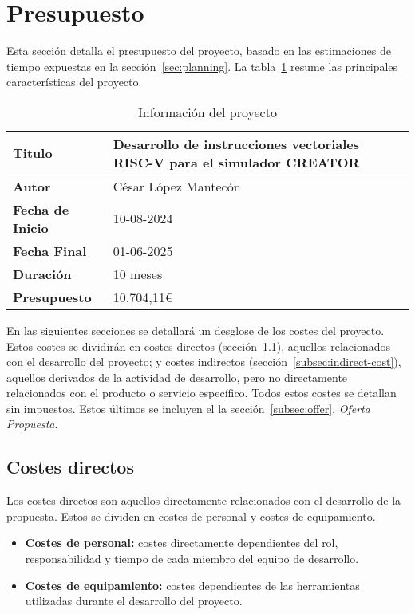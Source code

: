 \section{Presupuesto}\label{sec:budget}
Esta sección detalla el presupuesto del proyecto, basado en las estimaciones de tiempo expuestas en la sección~\ref{sec:planning}. La tabla~\ref{table:project-summary} resume las principales características del proyecto.

\begin{table}[H]
    \begin{tabular}{@{}ll@{}}
    \toprule
    \textbf{Titulo}          & Desarrollo de instrucciones vectoriales RISC-V para el simulador CREATOR \\ \midrule
    \textbf{Autor}           & César López Mantecón  \\ \midrule
    \textbf{Fecha de Inicio} & 10-08-2024            \\ \midrule
    \textbf{Fecha Final}     & 01-06-2025            \\ \midrule
    \textbf{Duración}        & 10 meses              \\ \midrule
    \textbf{Presupuesto}     & 10.704,11\euro        \\ \bottomrule
    \end{tabular}
    \caption{Información del proyecto}\label{table:project-summary} 
\end{table}

En las siguientes secciones se detallará un desglose de los costes del proyecto. Estos costes se dividirán en costes directos (sección~\ref{subsec:direct-cost}), aquellos relacionados con el desarrollo del proyecto; y costes indirectos (sección~\ref{subsec:indirect-cost}), aquellos derivados de la actividad de desarrollo, pero no directamente relacionados con el producto o servicio específico. Todos estos costes se detallan sin impuestos. Estos últimos se incluyen el la sección~\ref{subsec:offer}, \textit{Oferta Propuesta}.

\subsection{Costes directos}\label{subsec:direct-cost}
Los costes directos son aquellos directamente relacionados con el desarrollo de la propuesta. Estos se dividen en costes de personal y costes de equipamiento.

\begin{itemize}
    \item\textbf{Costes de personal:} costes directamente dependientes del rol, responsabilidad y tiempo de cada miembro del equipo de desarrollo.
    \item\textbf{Costes de equipamiento:} costes dependientes de las herramientas utilizadas durante el desarrollo del proyecto.
\end{itemize}

